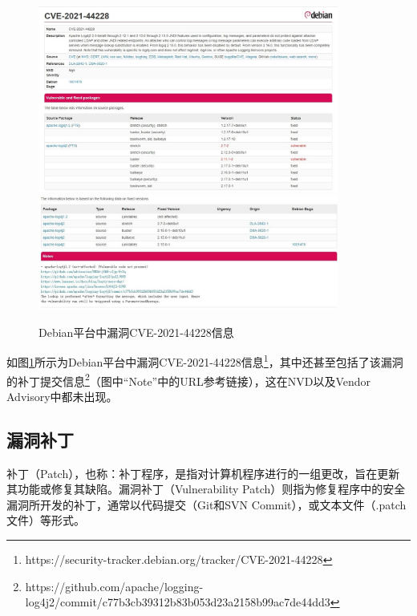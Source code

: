 

\begin{figure}[h]
    \centering
    \includegraphics[width=0.88\textwidth]{fig/debian-2021-44228}
    \includegraphics[width=0.88\textwidth]{fig/debian-2021-44228-2}
    \caption{Debian平台中漏洞CVE-2021-44228信息}
    \label{fig:debian-2021-44228}
\end{figure}
如图\ref{fig:debian-2021-44228}所示为Debian平台中漏洞CVE-2021-44228信息\footnote{https://security-tracker.debian.org/tracker/CVE-2021-44228}，其中还甚至包括了该漏洞的补丁提交信息\footnote{https://github.com/apache/logging-log4j2/commit/c77b3cb39312b83b053d23a2158b99ac7de44dd3}（图中“Note”中的URL参考链接），这在NVD以及Vendor Advisory中都未出现。


\subsection{漏洞补丁}
补丁（Patch），也称：补丁程序，是指对计算机程序进行的一组更改，旨在更新其功能或修复其缺陷。漏洞补丁（Vulnerability Patch）则指为修复程序中的安全漏洞所开发的补丁，通常以代码提交（Git和SVN Commit），或文本文件（.patch文件）等形式。

